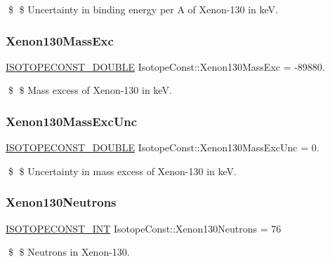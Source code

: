 \$ \$ Uncertainty in binding energy per A of Xenon-\/130 in keV. \mbox{\label{group___isotope_const-_xenon-_xe130_gafc01d6e2a83baf663b254caa5e8188c4}} 
\subsubsection{\texorpdfstring{Xenon130\+Mass\+Exc}{Xenon130MassExc}}
{\footnotesize\ttfamily \mbox{\hyperlink{group___isotope_const-_macros_ga8f45a7272ce02c0b4c65c44636ed719a}{I\+S\+O\+T\+O\+P\+E\+C\+O\+N\+S\+T\+\_\+\+D\+O\+U\+B\+LE}} Isotope\+Const\+::\+Xenon130\+Mass\+Exc = -\/89880.}

\$ \$ Mass excess of Xenon-\/130 in keV. \mbox{\label{group___isotope_const-_xenon-_xe130_ga02e60ae66d0ada841e2d9b8beb86a6a3}} 
\subsubsection{\texorpdfstring{Xenon130\+Mass\+Exc\+Unc}{Xenon130MassExcUnc}}
{\footnotesize\ttfamily \mbox{\hyperlink{group___isotope_const-_macros_ga8f45a7272ce02c0b4c65c44636ed719a}{I\+S\+O\+T\+O\+P\+E\+C\+O\+N\+S\+T\+\_\+\+D\+O\+U\+B\+LE}} Isotope\+Const\+::\+Xenon130\+Mass\+Exc\+Unc = 0.}

\$ \$ Uncertainty in mass excess of Xenon-\/130 in keV. \mbox{\label{group___isotope_const-_xenon-_xe130_gabd54d73a015711b1d88b057bc0b231ec}} 
\subsubsection{\texorpdfstring{Xenon130\+Neutrons}{Xenon130Neutrons}}
{\footnotesize\ttfamily \mbox{\hyperlink{group___isotope_const-_macros_ga5f18360b3e99483a35c32d789e62621c}{I\+S\+O\+T\+O\+P\+E\+C\+O\+N\+S\+T\+\_\+\+I\+NT}} Isotope\+Const\+::\+Xenon130\+Neutrons = 76}

\$ \$ Neutrons in Xenon-\/130. \mbox{\label{group___isotope_const-_xenon-_xe130_gabbf7ae5bb56e6519dfed54e00f51deb8}} 
